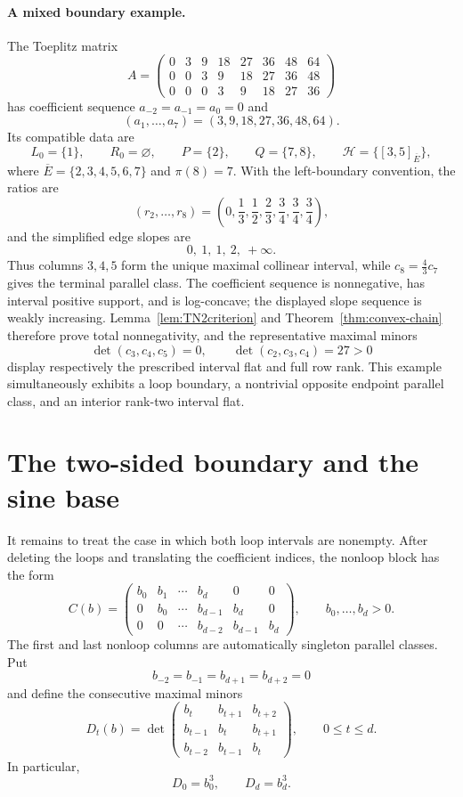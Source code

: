 \documentclass{amsart}
\numberwithin{equation}{section}
\theoremstyle{definition}
\theoremstyle{remark}
\begin{document}
\paragraph{A mixed boundary example.}
The Toeplitz matrix
\[
 A=
 \begin{pmatrix}
 0&3&9&18&27&36&48&64\\
 0&0&3&9&18&27&36&48\\
 0&0&0&3&9&18&27&36
 \end{pmatrix}
\]
has coefficient sequence $a_{-2}=a_{-1}=a_0=0$ and
\[
 (a_1,\ldots,a_7)=(3,9,18,27,36,48,64).
\]
Its compatible data are
\[
 L_0=\{1\},\qquad R_0=\varnothing,\qquad
 P=\{2\},\qquad Q=\{7,8\},\qquad
 \mathcal H=\bigl\{[3,5]_{\overline E}\bigr\},
\]
where $\overline E=\{2,3,4,5,6,7\}$ and $\pi(8)=7$.  With the left-boundary convention, the ratios are
\[
 (r_2,\ldots,r_8)
 =\left(0,\frac13,\frac12,\frac23,\frac34,\frac34,\frac34\right),
\]
and the simplified edge slopes are
\[
 0,\ 1,\ 1,\ 2,\ +\infty.
\]
Thus columns $3,4,5$ form the unique maximal collinear interval, while $c_8=\frac43c_7$ gives the terminal parallel class.  The coefficient sequence is nonnegative, has interval positive support, and is log-concave; the displayed slope sequence is weakly increasing.  Lemma~\ref{lem:TN2criterion} and Theorem~\ref{thm:convex-chain} therefore prove total nonnegativity, and the representative maximal minors
\[
 \det(c_3,c_4,c_5)=0,
 \qquad
 \det(c_2,c_3,c_4)=27>0
\]
display respectively the prescribed interval flat and full row rank.  This example simultaneously exhibits a loop boundary, a nontrivial opposite endpoint parallel class, and an interior rank-two interval flat.

\section{The two-sided boundary and the sine base}

It remains to treat the case in which both loop intervals are nonempty.  After deleting the loops and translating the coefficient indices, the nonloop block has the form
\begin{equation}\label{eq:Cbanded}
 C(b)=
 \begin{pmatrix}
 b_0&b_1&\cdots&b_d&0&0\\
 0&b_0&\cdots&b_{d-1}&b_d&0\\
 0&0&\cdots&b_{d-2}&b_{d-1}&b_d
 \end{pmatrix},
 \qquad b_0,\ldots,b_d>0.
\end{equation}
The first and last nonloop columns are automatically singleton parallel classes.  Put
\[
 b_{-2}=b_{-1}=b_{d+1}=b_{d+2}=0
\]
and define the consecutive maximal minors
\begin{equation}\label{eq:Dt}
 D_t(b)=
 \det\begin{pmatrix}
 b_t&b_{t+1}&b_{t+2}\\
 b_{t-1}&b_t&b_{t+1}\\
 b_{t-2}&b_{t-1}&b_t
 \end{pmatrix},
 \qquad 0\le t\le d.
\end{equation}
In particular,
\begin{equation}\label{eq:endD}
 D_0=b_0^3,
 \qquad
 D_d=b_d^3.
\end{equation}
\end{document}
